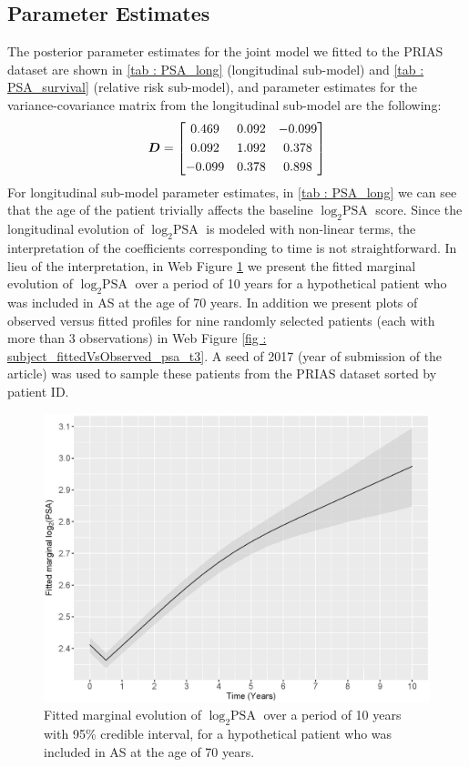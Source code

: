 \subsection{Parameter Estimates}
\label{subsec : param_estimates}
The posterior parameter estimates for the joint model we fitted to the PRIAS dataset are shown in \ref{tab : PSA_long} (longitudinal sub-model) and \ref{tab : PSA_survival} (relative risk sub-model), and parameter estimates for the variance-covariance matrix from the longitudinal sub-model are the following:
\begin{equation*}
\boldsymbol{D} = \begin{bmatrix}
       0.469 & 0.092 & -0.099 \\[0.3em]
       0.092 & 1.092 & 0.378 \\[0.3em]
       -0.099 & 0.378 & 0.898
     \end{bmatrix}
\end{equation*} 
For longitudinal sub-model parameter estimates, in \ref{tab : PSA_long} we can see that the age of the patient trivially affects the baseline $\log_2 \mbox{PSA}$ score. Since the longitudinal evolution of $\log_2 \mbox{PSA}$ is modeled with non-linear terms, the interpretation of the coefficients corresponding to time is not straightforward. In lieu of the interpretation, in Web Figure \ref{fig : fitted_trend_psa} we present the fitted marginal evolution of $\log_2 \mbox{PSA}$ over a period of 10 years for a hypothetical patient who was included in AS at the age of 70 years. In addition we present plots of observed versus fitted profiles for nine randomly selected patients (each with more than 3 observations) in Web Figure \ref{fig : subject_fittedVsObserved_psa_t3}. A seed of 2017 (year of submission of the article) was used to sample these patients from the PRIAS dataset sorted by patient ID.

\begin{figure}[!htb]
\centerline{\includegraphics[width=\columnwidth]{images/model_fit/marginal_fitted_psa_t3.eps}}
\caption{Fitted marginal evolution of $\log_2 \mbox{PSA}$ over a period of 10 years with 95\% credible interval, for a hypothetical patient who was included in AS at the age of 70 years.}
\label{fig : fitted_trend_psa}
\end{figure}

